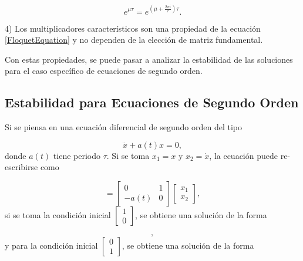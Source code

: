\documentclass[10pt,a4paper]{report}
\begin{document}
\begin{equation}
e^{\mu \tau} = e^{(\mu  +\frac{2\pi i}{\tau} )\tau}.
\end{equation}

4) Los multiplicadores característicos son una propiedad de la ecuación \eqref{FloquetEquation} y no dependen de la elección de matriz fundamental.

Con estas propiedades, se puede pasar a analizar la estabilidad de las soluciones para el caso específico de ecuaciones de segundo orden.

\subsection{Estabilidad para Ecuaciones de Segundo Orden}\label{EstabilidadSO}

Si se piensa en una ecuación diferencial de segundo orden del tipo

\begin{equation}
\ddot{x} + a(t)x= 0,
\end{equation} donde $a(t)$ tiene periodo $\tau$. Si se toma $x_1 = x$ y $x_2 = \dot{x}$, la ecuación puede re-escribirse como

\begin{equation}
[\begin{array}{c}
\dot{x_1} \\
\dot{x_2}
\end{array}] = [\begin{array}{cc}
0 & 1 \\
-a(t) & 0
\end{array}][\begin{array}{c} 
x_1 \\ 
x_2

\end{array}],
\end{equation} si se toma la condición inicial $[\begin{array}{c} 1 \\ 0 \end{array}]$, se obtiene una solución de la forma

\begin{equation}
[\begin{array}{c}
x_1^1(t) \\
\dot{x_1^1(t)}
\end{array}],
\end{equation} y para la condición inicial $[\begin{array}{c} 0 \\ 1 \end{array}]$, se obtiene una solución de la forma
\end{document}
